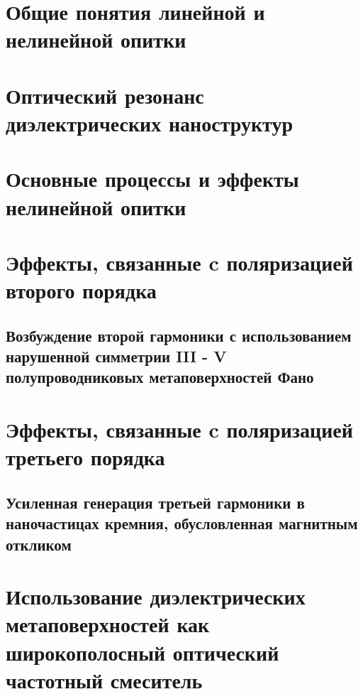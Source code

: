 \section{Общие понятия линейной и нелинейной опитки}


\section{Оптический резонанс  диэлектрических наноструктур}


\section{Основные процессы и эффекты нелинейной опитки}


\section{Эффекты, связанные c поляризацией второго порядка}

\subsection{Возбуждение второй гармоники с использованием нарушенной симметрии III - V полупроводниковых метаповерхностей Фано}


\section{Эффекты, связанные c поляризацией третьего порядка}

\subsection{Усиленная генерация третьей гармоники в наночастицах кремния, обусловленная магнитным откликом}

\section{Использование диэлектрических метаповерхностей как широкополосный оптический частотный смеситель}


